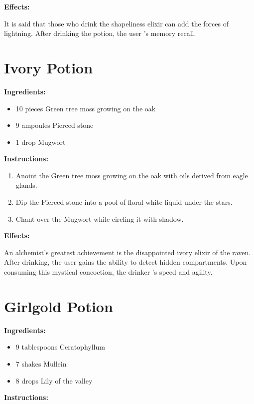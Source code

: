 \documentclass{article}
\begin{document}
\textbf{Effects:}

It is said that those who drink the shapeliness elixir can add the forces of lightning. After drinking the potion, the user 's memory recall.

\newpage
\section*{Ivory Potion}

\textbf{Ingredients:}

\begin{itemize}
  \item 10 pieces Green tree moss growing on the oak
  \item 9 ampoules Pierced stone
  \item 1 drop Mugwort
\end{itemize}

\textbf{Instructions:}

\begin{enumerate}
  \item Anoint the Green tree moss growing on the oak with oils derived from eagle glands.
  \item Dip the Pierced stone into a pool of floral white liquid under the stars.
  \item Chant over the Mugwort while circling it with shadow.
\end{enumerate}

\textbf{Effects:}

An alchemist's greatest achievement is the disappointed ivory elixir of the raven. After drinking, the user gains the ability to detect hidden compartments. Upon consuming this mystical concoction, the drinker 's speed and agility.

\newpage
\section*{Girlgold Potion}

\textbf{Ingredients:}

\begin{itemize}
  \item 9 tablespoons Ceratophyllum
  \item 7 shakes Mullein
  \item 8 drops Lily of the valley
\end{itemize}

\textbf{Instructions:}
\end{document}
